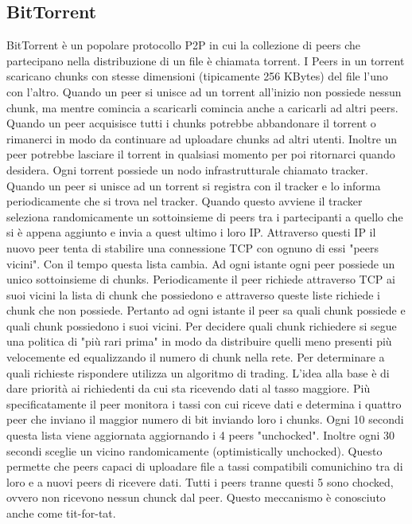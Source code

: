 \subsection{BitTorrent}
BitTorrent \`e un popolare protocollo P2P in cui la collezione di peers che partecipano nella distribuzione di un file \`e chiamata torrent. I Peers in un
torrent scaricano chunks con stesse dimensioni (tipicamente 256 KBytes) del file l'uno con l'altro. Quando un peer si unisce ad un torrent all'inizio non
possiede nessun chunk, ma mentre comincia a scaricarli comincia anche a caricarli ad altri peers. Quando un peer acquisisce tutti i chunks potrebbe 
abbandonare il torrent o rimanerci in modo da continuare ad uploadare chunks ad altri utenti. Inoltre un peer potrebbe lasciare il torrent in qualsiasi 
momento per poi ritornarci quando desidera. Ogni torrent possiede un nodo infrastrutturale chiamato tracker. Quando un peer si unisce ad un torrent si 
registra con il tracker e lo informa periodicamente che si trova nel tracker. Quando questo avviene il tracker seleziona randomicamente un sottoinsieme di
peers tra i partecipanti a quello che si \`e appena aggiunto e invia a quest ultimo i loro IP. Attraverso questi IP il nuovo peer tenta di stabilire una
connessione TCP con ognuno di essi "peers vicini". Con il tempo questa lista cambia. Ad ogni istante ogni peer possiede un unico sottoinsieme di chunks. 
Periodicamente il peer richiede attraverso TCP ai suoi vicini la lista di chunk che possiedono e attraverso queste liste richiede i chunk che non possiede.
Pertanto ad ogni istante il peer sa quali chunk possiede e quali chunk possiedono i suoi vicini. Per decidere quali chunk richiedere si segue una politica
di "pi\`u rari prima" in modo da distribuire quelli meno presenti pi\`u velocemente ed equalizzando il numero di chunk nella rete. Per determinare a quali
richieste rispondere utilizza un algoritmo di trading. L'idea alla base \`e di dare priorit\`a ai richiedenti da cui sta ricevendo dati al tasso maggiore. 
Pi\`u specificatamente il peer monitora i tassi con cui riceve dati e determina i quattro peer che inviano il maggior numero di bit inviando loro i chunks.
Ogni 10 secondi questa lista viene aggiornata aggiornando i 4 peers "unchocked". Inoltre ogni 30 secondi sceglie un vicino randomicamente (optimistically 
unchocked). Questo permette che peers capaci di uploadare file a tassi compatibili comunichino tra di loro e a nuovi peers di ricevere dati. Tutti i peers
tranne questi 5 sono chocked, ovvero non ricevono nessun chunck dal peer. Questo meccanismo \`e conosciuto anche come tit-for-tat.
